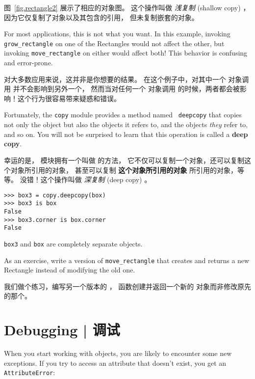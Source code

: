 图~\ref{fig.rectangle2} 展示了相应的对象图。 这个操作叫做 {\em 浅复制} (shallow
copy) ，因为它仅复制了对象以及其包含的引用， 但未复制嵌套的对象。
  
  
  

For most applications, this is not what you want.  In this example,
invoking \verb"grow_rectangle" on one of the Rectangles would not
affect the other, but invoking \verb"move_rectangle" on either would
affect both!  This behavior is confusing and error-prone.

对大多数应用来说，这并非是你想要的结果。
在这个例子中，对其中一个  对象调用 并不会影响到另外一个， 然而当对任何一个  对象调用 的时候，两者都会被影响！这个行为很容易带来疑惑和错误。
  

Fortunately, the {\tt copy} module provides a method named {\tt
deepcopy} that copies not only the object but also
the objects it refers to, and the objects {\em they} refer to,
and so on.  
You will not be surprised to learn that this operation is
called a {\bf deep copy}.

幸运的是，  模块拥有一个叫做  的方法，
它不仅可以复制一个对象，还可以复制这个对象所引用的对象，
甚至可以复制 {\bf 这个对象所引用的对象} 所引用的对象，等等。
没错！这个操作叫做 {\em 深复制} (deep copy) 。

  

\begin{lstlisting}
>>> box3 = copy.deepcopy(box)
>>> box3 is box
False
>>> box3.corner is box.corner
False
\end{lstlisting}
%
{\tt box3} and {\tt box} are completely separate objects.

As an exercise, write a version of \verb"move_rectangle" that creates and
returns a new Rectangle instead of modifying the old one.

我们做个练习，编写另一个版本的  ，
函数创建并返回一个新的  对象而非修改原先的那个。

\section{Debugging  |  调试}
\label{hasattr}

When you start working with objects, you are likely to encounter
some new exceptions.  If you try to access an attribute
that doesn't exist, you get an {\tt AttributeError}:

